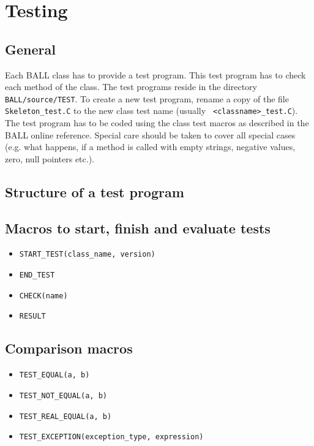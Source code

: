 \documentclass[a4]{article}
\begin{document}
\section{Testing}

\subsection{General}

Each BALL class has to provide a test program. This test program has to check
each method of the class. The test programs reside in the directory
{\tt BALL/source/TEST}. To create a new test program, rename a copy of the file
{\tt Skeleton\_test.C} to the new class test name (usually {\tt
<classname>\_test.C}). The test program has to be coded using the class test
macros as described in the BALL online reference. Special care should be taken
to cover all special cases (e.g. what happens, if a method is called with
empty strings, negative values, zero, null pointers etc.).


\subsection{Structure of a test program}

\subsection{Macros to start, finish and evaluate tests}
\begin{itemize}
	\item {\tt START\_TEST(class\_name, version)}
	\item {\tt END\_TEST}
	\item {\tt CHECK(name)}
	\item {\tt RESULT}
\end{itemize}

\subsection{Comparison macros}
\begin{itemize}
	\item {\tt TEST\_EQUAL(a, b)}
	\item {\tt TEST\_NOT\_EQUAL(a, b)}
	\item {\tt TEST\_REAL\_EQUAL(a, b)}
	\item {\tt TEST\_EXCEPTION(exception\_type, expression)}	
\end{itemize}
\end{document}
